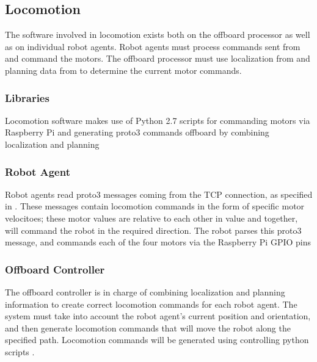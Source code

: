 
\subsection{Locomotion}
\label{sec:software_locomotion}
The software involved in locomotion exists both on the offboard processor as well as on individual robot agents. Robot agents must process commands sent from  and command the motors. The offboard processor must use localization from  and planning data from  to determine the current motor commands.

\subsubsection{Libraries}
\label{sec:software_locomotion_libs}
Locomotion software makes use of Python 2.7 scripts \cite{python27} for commanding motors via Raspberry Pi \cite{python_rpigpio} and generating proto3 commands offboard by combining localization and planning

\subsubsection{Robot Agent}
\label{sec:software_locomotion_robot}
Robot agents read proto3 messages coming from the TCP connection, as specified in . These messages contain locomotion commands in the form of specific motor velocitoes; these motor values are relative to each other in value and together, will command the robot in the required direction. The robot parses this proto3 message, and commands each of the four motors via the Raspberry Pi GPIO pins \cite{python_rpigpio}

\subsubsection{Offboard Controller}
\label{sec:software_locomotion_offboard}
The offboard controller is in charge of combining localization and planning information to create correct locomotion commands for each robot agent. The system must take into account the robot agent's current position and orientation, and then generate locomotion commands that will move the robot along the specified path. Locomotion commands will be generated using controlling python scripts \cite{python27}.

